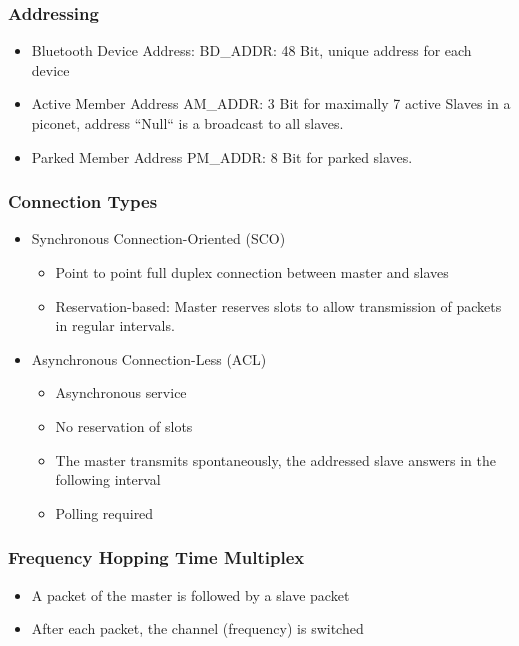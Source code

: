 \subsubsection{Addressing}
\begin{itemize}[noitemsep]
\item Bluetooth Device Address: BD\_ADDR: 48 Bit, unique address for each device
\item Active Member Address AM\_ADDR: 3 Bit for maximally 7 active Slaves in a piconet, address “Null“ is a broadcast to all slaves.
\item Parked Member Address PM\_ADDR: 8 Bit for parked slaves.
\end{itemize}

\subsubsection{Connection Types}
\begin{itemize}[noitemsep]
\item Synchronous Connection-Oriented (SCO)
	\begin{itemize}
	\item Point to point full duplex connection between master and slaves
	\item Reservation-based: Master reserves slots to allow transmission of packets in 
	regular intervals. 
	\end{itemize}
\item Asynchronous Connection-Less (ACL)
	\begin{itemize}
	\item Asynchronous service
	\item No reservation of slots
	\item The master transmits spontaneously, the addressed slave answers in the following interval
	\item Polling required
	\end{itemize}
\end{itemize}

\subsubsection{Frequency Hopping Time Multiplex}
\begin{itemize}[noitemsep]
\item A packet of the master is followed by a slave packet
\item After each packet, the channel (frequency) is switched

\end{itemize}

